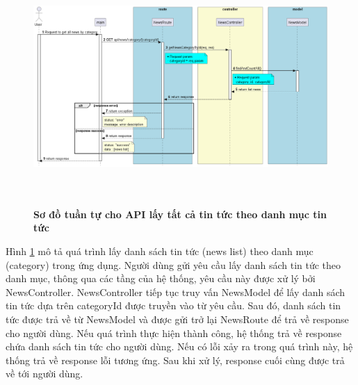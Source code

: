 \begin{enumerate}[a)]
\begin{figure}[H]
  \centering
  \includegraphics[width=16cm,height=9cm]{Images/server/sequence/server/getNewsByCategory.png}
  \caption[Sơ đồ tuần tự cho API lấy tất cả tin tức theo loại tin tức ]{\bfseries \fontsize{12pt}{0pt}
  \selectfont Sơ đồ tuần tự cho API lấy tất cả tin tức theo danh mục tin tức }
  \label{getNewsByCategory} %
\end{figure}
Hình \ref{getNewsByCategory} mô tả quá trình lấy danh sách tin tức (news list) theo danh mục (category) trong ứng dụng. Người dùng gửi yêu cầu lấy danh sách tin tức theo danh mục, thông qua các tầng của hệ thống, yêu cầu này được xử lý bởi NewsController. NewsController tiếp tục truy vấn NewsModel để lấy danh sách tin tức dựa trên categoryId được truyền vào từ yêu cầu. Sau đó, danh sách tin tức được trả về từ NewsModel và được gửi trở lại NewsRoute để trả về response cho người dùng. Nếu quá trình thực hiện thành công, hệ thống trả về response chứa danh sách tin tức cho người dùng. Nếu có lỗi xảy ra trong quá trình này, hệ thống trả về response lỗi tương ứng. Sau khi xử lý, response cuối cùng được trả về tới người dùng.



\end{enumerate}
